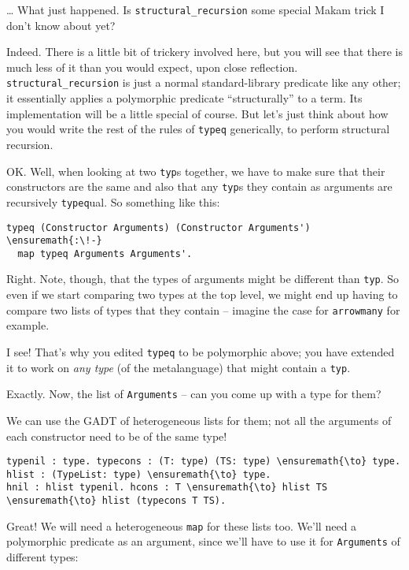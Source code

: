 \importantCodeblockEnd{}

\heroSTUDENT{} \ldots{} What just happened. Is \texttt{structural\_recursion}
some special Makam trick I don't know about yet?

\heroADVISOR{} Indeed. There is a little bit of trickery involved here, but
you will see that there is much less of it than you would expect, upon
close reflection. \texttt{structural\_recursion} is just a normal
standard-library predicate like any other; it essentially applies a
polymorphic predicate ``structurally'' to a term. Its implementation
will be a little special of course. But let's just think about how you
would write the rest of the rules of \texttt{typeq} generically, to
perform structural recursion.

\heroSTUDENT{} OK. Well, when looking at two \texttt{typ}s together, we have
to make sure that their constructors are the same and also that any
\texttt{typ}s they contain as arguments are recursively
\texttt{typeq}ual. So something like this:

\begin{verbatim}
typeq (Constructor Arguments) (Constructor Arguments') \ensuremath{:\!-}
  map typeq Arguments Arguments'.
\end{verbatim}

\heroADVISOR{} Right. Note, though, that the types of arguments might be
different than \texttt{typ}. So even if we start comparing two types at
the top level, we might end up having to compare two lists of types that
they contain -- imagine the case for \texttt{arrowmany} for example.

\heroSTUDENT{} I see! That's why you edited \texttt{typeq} to be polymorphic
above; you have extended it to work on \emph{any type} (of the
metalanguage) that might contain a \texttt{typ}.

\heroADVISOR{} Exactly. Now, the list of \texttt{Arguments} -- can you come up
with a type for them?

\heroSTUDENT{} We can use the GADT of heterogeneous lists for them; not all
the arguments of each constructor need to be of the same type!

\begin{verbatim}
typenil : type. typecons : (T: type) (TS: type) \ensuremath{\to} type.
hlist : (TypeList: type) \ensuremath{\to} type.
hnil : hlist typenil. hcons : T \ensuremath{\to} hlist TS \ensuremath{\to} hlist (typecons T TS).
\end{verbatim}

\heroADVISOR{} Great! We will need a heterogeneous \texttt{map} for these
lists too. We'll need a polymorphic predicate as an argument, since
we'll have to use it for \texttt{Arguments} of different types:

